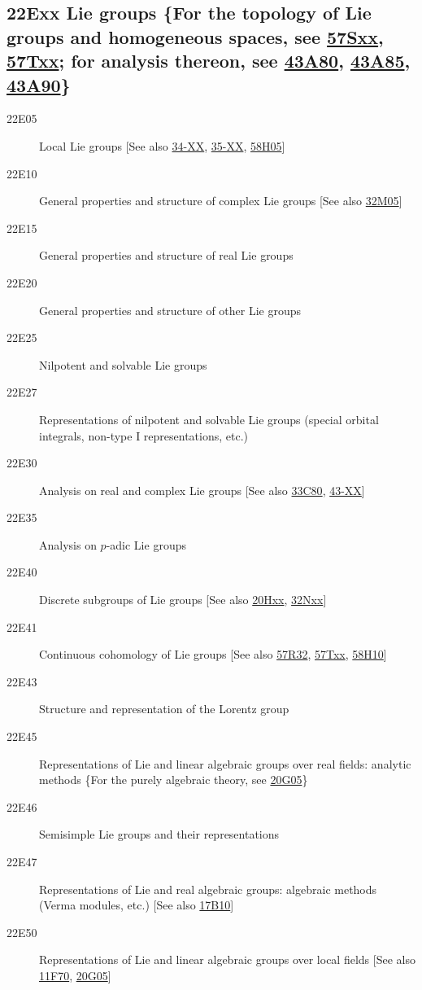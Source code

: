 \subsection*{22Exx  Lie groups \{For the topology of Lie groups and homogeneous spaces, see \hyperref[57Sxx]{57Sxx}, \hyperref[57Txx]{57Txx}; for analysis thereon, see \hyperref[43A80]{43A80}, \hyperref[43A85]{43A85}, \hyperref[43A90]{43A90}\} }\label{22Exx}
\begin{description}  
\item [22E05]\label{22E05} Local Lie groups [See also \hyperref[34-XX]{34-XX}, \hyperref[35-XX]{35-XX}, \hyperref[58H05]{58H05}]
\item [22E10]\label{22E10} General properties and structure of complex Lie groups [See also \hyperref[32M05]{32M05}]
\item [22E15]\label{22E15} General properties and structure of real Lie groups
\item [22E20]\label{22E20} General properties and structure of other Lie groups
\item [22E25]\label{22E25} Nilpotent and solvable Lie groups
\item [22E27]\label{22E27} Representations of nilpotent and solvable Lie groups (special orbital integrals, non-type I representations, etc.)
\item [22E30]\label{22E30} Analysis on real and complex Lie groups [See also \hyperref[33C80]{33C80}, \hyperref[43-XX]{43-XX}]
\item [22E35]\label{22E35} Analysis on $p$-adic Lie groups
\item [22E40]\label{22E40} Discrete subgroups of Lie groups [See also \hyperref[20Hxx]{20Hxx}, \hyperref[32Nxx]{32Nxx}]
\item [22E41]\label{22E41} Continuous cohomology of Lie groups [See also \hyperref[57R32]{57R32}, \hyperref[57Txx]{57Txx}, \hyperref[58H10]{58H10}]
\item [22E43]\label{22E43} Structure and representation of the Lorentz group
\item [22E45]\label{22E45} Representations of Lie and linear algebraic groups over real fields: analytic methods \{For the purely algebraic theory, see \hyperref[20G05]{20G05}\}
\item [22E46]\label{22E46} Semisimple Lie groups and their representations
\item [22E47]\label{22E47} Representations of Lie and real algebraic groups: algebraic methods (Verma modules, etc.) [See also \hyperref[17B10]{17B10}]
\item [22E50]\label{22E50} Representations of Lie and linear algebraic groups over local fields [See also \hyperref[11F70]{11F70}, \hyperref[20G05]{20G05}]

\end{description}
